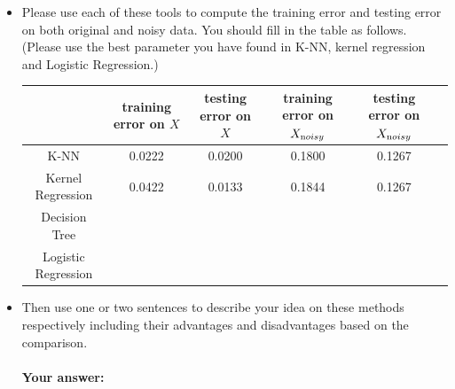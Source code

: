 \documentclass[english]{article}
\begin{document}
\begin{itemize}

\item Please use each of these tools to compute the training error and testing error on both original and noisy data. You should fill in the table as follows. (Please use the best parameter you have found in K-NN, kernel regression and Logistic Regression.)


\begin{table}[!htb]
\centering
\begin{tabular}{|c|c|c|c|c|c|} \hline
&training error on $X$& testing error on $X$&training error on $X_{\text noisy}$&testing error on $X_{\text noisy}$\\ \hline
K-NN & 0.0222 & 0.0200 & 0.1800 & 0.1267 \\ \hline
Kernel Regression & 0.0422 & 0.0133 & 0.1844 & 0.1267 \\ \hline
Decision Tree & & & & \\ \hline
Logistic Regression & & & & \\ \hline
\end{tabular}
\end{table} 

\item Then use one or two sentences to describe your idea on these methods respectively including their advantages and disadvantages based on the comparison. 

\paragraph{Your answer:}
 ~\\
 
\end{itemize}
\end{document}
